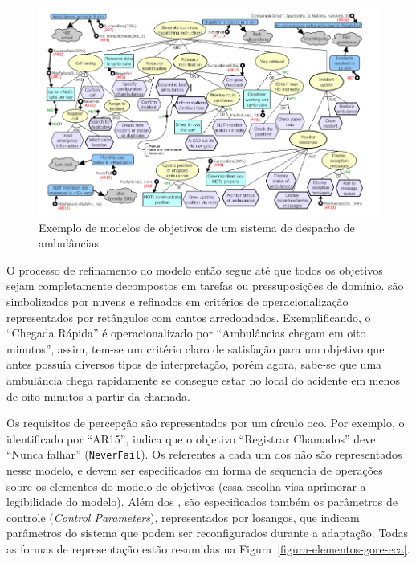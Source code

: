 \begin{figure}[h]
	\centering
	\includegraphics[width=1\textwidth]{figuras/modelos/ACAD-Completo.png}
	\caption{Exemplo de modelos de objetivos de um sistema de despacho de ambulâncias ~\cite{tesevitor}}
	\label{figura-acad-completo}
\end{figure}

O processo de refinamento do modelo então segue até que todos os objetivos sejam completamente decompostos em tarefas ou pressuposições de domínio. \sofgoals são simbolizados por nuvens e refinados em critérios de operacionalização representados por retângulos com cantos arredondados. Exemplificando, o \sofgoal ``Chegada Rápida'' é operacionalizado por ``Ambulâncias chegam em oito minutos'', assim, tem-se um critério claro de satisfação para um objetivo que antes possuía diversos tipos de interpretação, porém agora, sabe-se que uma ambulância chega rapidamente se consegue estar no local do acidente em menos de oito minutos a partir da chamada.

Os requisitos de percepção são representados por um círculo oco. Por exemplo, o \awreq identificado por ``AR15'', indica que o objetivo ``Registrar Chamados'' deve ``Nunca falhar'' (\texttt{NeverFail}). Os \evoreqs referentes a cada um dos \awreqs não são representados nesse modelo, e devem ser especificados em forma de sequencia de operações sobre os elementos do modelo de objetivos (essa escolha visa aprimorar a legibilidade do modelo). Além dos \awreqs, são especificados também os parâmetros de controle (\textit{Control Parameters}), representados por losangos, que indicam parâmetros do sistema que podem ser reconfigurados durante a adaptação. Todas as formas de representação estão resumidas na Figura~\ref{figura-elementos-gore-eca}.

